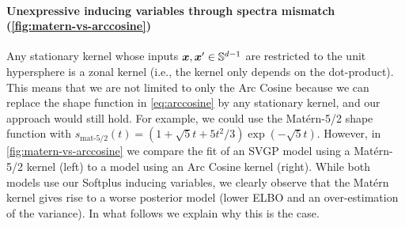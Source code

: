 
\paragraph{Unexpressive inducing variables through spectra mismatch (\cref{fig:matern-vs-arccosine})} Any stationary kernel whose inputs $\bm{x},\bm{x}' \in \mathbb{S}^{d-1}$ are restricted to the unit hypersphere is a zonal kernel (i.e., the kernel only depends on the dot-product). This means that we are not limited to only the Arc Cosine because we can replace the shape function in \cref{eq:arccosine} by any stationary kernel, and our approach would still hold. For example, we could use the Mat\'ern-5/2 shape function with $s_{\text{mat-5/2}}(t) = \left(1+{{{\sqrt {5}} t}}+{{5 t^{2}}/{3}}\right)\exp \left(-{{{\sqrt {5}} t}}\right)$. However, in \cref{fig:matern-vs-arccosine} we compare the fit of an SVGP model using a Mat\'ern-5/2 kernel (left) to a model using an Arc Cosine kernel (right). While both models use our Softplus inducing variables, we clearly observe that the Mat\'ern kernel gives rise to a worse posterior model (lower ELBO and an over-estimation of the variance). In what follows we explain why this is the case.

